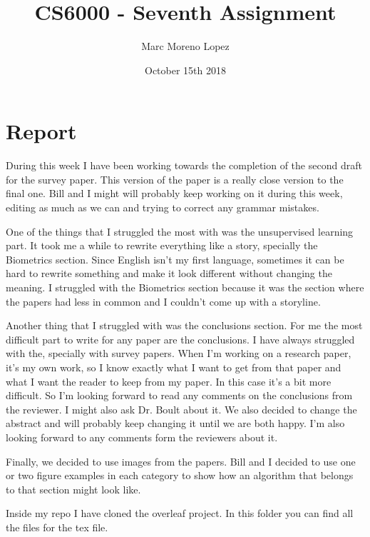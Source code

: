 \documentclass{article}
\title{CS6000 - Seventh Assignment}
\author{Marc Moreno Lopez}
\date{October 15th 2018}
\begin{document}
\maketitle

\section{Report}


During this week I have been working towards the completion of the second draft for the survey paper. This version of the paper is a really close version to the final one. Bill and I might will probably keep working on it during this week, editing as much as we can and trying to correct any grammar mistakes.

One of the things that I struggled the most with was the unsupervised learning part. It took me a while to rewrite everything like a story, specially the Biometrics section. Since English isn't my first language, sometimes it can be hard to rewrite something and make it look different without changing the meaning. I struggled with the Biometrics section because it was the section where the papers had less in common and I couldn't come up with a storyline. 

Another thing that I struggled with was the conclusions section. For me the most difficult part to write for any paper are the conclusions. I have always struggled with the, specially with survey papers. When I'm working on a research paper, it's my own work, so I know exactly what I want to get from that paper and what I want the reader to keep from my paper. In this case it's a bit more difficult. So I'm looking forward to read any comments on the conclusions from the reviewer. I might also ask Dr. Boult about it. We also decided to change the abstract and will probably keep changing it until we are both happy. I'm also looking forward to any comments form the reviewers about it.

Finally, we decided to use images from the papers. Bill and I decided to use one or two figure examples in each category to show how an algorithm that belongs to that section might look like. 

Inside my repo I have cloned the overleaf project. In this folder you can find all the files for the tex file.
\end{document}
